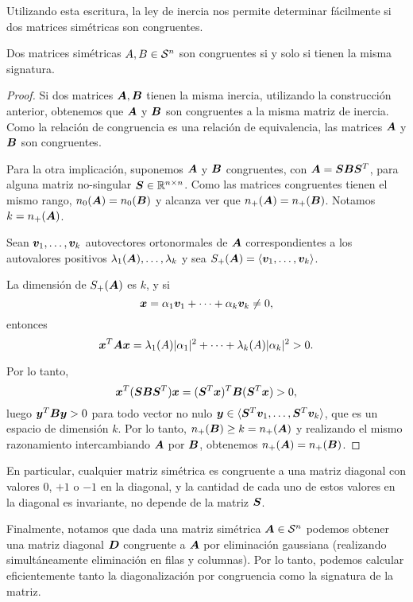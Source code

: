 Utilizando esta escritura, la ley de inercia nos permite determinar fácilmente si dos matrices simétricas son congruentes.

\begin{theorem}
Dos matrices simétricas $A, B \in {\mathcal S^n}$ son congruentes si y solo si tienen la misma signatura.
\end{theorem}

\begin{proof}
Si dos matrices $\bm{A}, \bm{B}$ tienen la misma inercia, utilizando la construcción anterior, obtenemos que $\bm{A}$ y $\bm{B}$ son congruentes a la misma matriz de inercia. Como la relación de congruencia es una relación de equivalencia, las matrices $\bm{A}$ y $\bm{B}$ son congruentes.

Para la otra implicación, suponemos $\bm{A}$ y $\bm{B}$ congruentes, con $\bm{A} = \bm{S} \bm{B} \bm{S}^T$, para alguna matriz no-singular $\bm{S} \in \mathbb{R}^{n\times n}$. Como las matrices congruentes tienen el mismo rango, $n_0(\bm{A}) = n_0(\bm{B})$ y alcanza ver que $n_+(\bm{A}) = n_+(\bm{B})$. Notamos $k = n_+(\bm{A})$.

Sean $\bm{v}_1, \dots, \bm{v}_k$ autovectores ortonormales de $\bm{A}$ correspondientes a los autovalores positivos $\lambda_1(\bm{A}), \dots, \lambda_{k}$ y sea $S_+(\bm{A}) = \langle \bm{v}_1, \dots, \bm{v}_{k} \rangle$.

La dimensión de $S_+(\bm{A})$ es $k$, y si
$$\bm{x} = \alpha_1 \bm{v}_1 + \dots + \alpha_k \bm{v}_{k} \neq 0,$$
entonces
$$\bm{x}^T \bm{A} \bm{x} = \lambda_1(A) |\alpha_1|^2 + \dots + \lambda_{k}(A) |\alpha_k|^2 > 0.$$

Por lo tanto,
$$
\bm{x}^T (\bm{S} \bm{B} \bm{S}^T) \bm{x} = (\bm{S}^T\bm{x})^T \bm{B} (\bm{S}^T \bm{x}) > 0,
$$
luego $\bm{y}^T \bm{B} \bm{y} > 0$ para todo vector no nulo $\bm{y} \in \langle \bm{S}^T \bm{v}_1, \dots, \bm{S}^T \bm{v}_k \rangle$, que es un espacio de dimensión $k$. Por lo tanto, $n_+(\bm{B}) \ge k = n_+(\bm{A})$ y realizando el mismo razonamiento intercambiando $\bm{A}$ por $\bm{B}$, obtenemos $n_+(\bm{A}) = n_+(\bm{B})$.
\end{proof}

En particular, cualquier matriz simétrica es congruente a una matriz diagonal con valores $0$, $+1$ o $-1$ en la diagonal, y la cantidad de cada uno de estos valores en la diagonal es invariante, no depende de la matriz $\bm{S}$.

Finalmente, notamos que dada una matriz simétrica $\bm{A} \in {\mathcal S^n}$ podemos obtener una matriz diagonal $\bm{D}$ congruente a $\bm{A}$ por eliminación gaussiana (realizando simultáneamente eliminación en filas y columnas). Por lo tanto, podemos calcular eficientemente tanto la diagonalización por congruencia como la signatura de la matriz.


